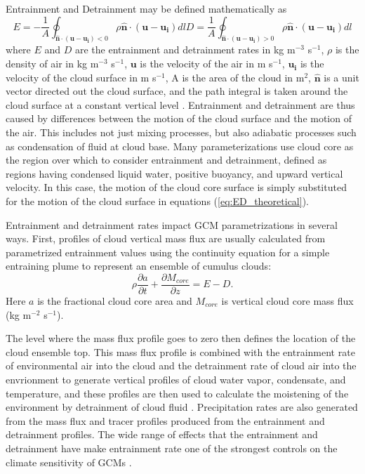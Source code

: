 \documentclass[12pt]{article}
\begin{document}
Entrainment and Detrainment may be defined mathematically as
\begin{subequations}
 \label{eq:ED_theoretical}
\begin{equation}
E = -\frac{1}{A}\oint_{\mathbf{\hat{n}}\cdot(\mathbf{u} - \mathbf{u_i}) < 0}
\rho\mathbf{\hat{n}}\cdot(\mathbf{u}-\mathbf{u_i})dl
\end{equation}
\begin{equation}
D = \frac{1}{A}\oint_{\mathbf{\hat{n}}\cdot(\mathbf{u} - \mathbf{u_i}) > 0}
\rho\mathbf{\hat{n}}\cdot(\mathbf{u}-\mathbf{u_i})dl
\end{equation}
\end{subequations}
where $E$ and $D$ are the entrainment and detrainment rates in kg m$^{-3}$ 
s$^{-1}$, $\rho$ is the density of air in kg m$^{-3}$ s$^{-1}$, $\mathbf{u}$ is 
the velocity of the air in m s$^{-1}$, $\mathbf{u_i}$ is the velocity of the 
cloud surface in m s$^{-1}$, A is the area of the cloud in m$^2$, 
$\mathbf{\hat{n}}$ is a unit vector directed out the cloud surface, and the 
path integral is taken around the cloud surface at a constant vertical level 
\citep{Siebesma1998}.  Entrainment and detrainment are thus caused by 
differences between the motion of the cloud surface and the motion of the air.  
This includes not just mixing processes, but also adiabatic processes such as 
condensation of fluid at cloud base.  Many parameterizations use cloud core as 
the region over which to consider entrainment and detrainment, defined as
regions having condensed liquid water, positive buoyancy, and upward vertical
velocity.  In this case, the motion of the cloud core surface is simply 
substituted for the motion of the cloud surface in equations 
(\ref{eq:ED_theoretical}).

Entrainment and detrainment rates impact GCM parametrizations in several ways.
First, profiles of cloud vertical mass flux are usually calculated from 
parametrized entrainment values using the continuity equation for a 
simple entraining plume to represent an ensemble of cumulus clouds:
\begin{equation}
   \label{eq:continuity}
   \rho \frac{\partial a}{\partial t} 
   + \frac{\partial M_{core}}{\partial z} = E - D.
\end{equation}
Here $a$ is the fractional cloud core area  and $M_{core}$ is vertical cloud core
mass flux (kg m$^{-2}$ s$^{-1}$). 

The level where the mass flux profile goes to zero then defines the location 
of the cloud ensemble top.  This mass flux profile is combined with the 
entrainment rate of environmental air into the cloud and the detrainment rate 
of cloud air into the envrionment to generate vertical profiles of cloud 
water vapor, condensate, and temperature, and these profiles are then used to 
calculate the moistening of the environment by detrainment of cloud fluid 
\citep{Tiedtke1989, Kain1990}.  Precipitation rates are also generated from the
mass flux and tracer profiles produced from the entrainment and detrainment
profiles.  The wide range of effects that the entrainment and detrainment have
make entrainment rate one of the strongest controls on the climate sensitivity 
of GCMs \citep{Stainforth2005, Rougier2009}.
\end{document}
